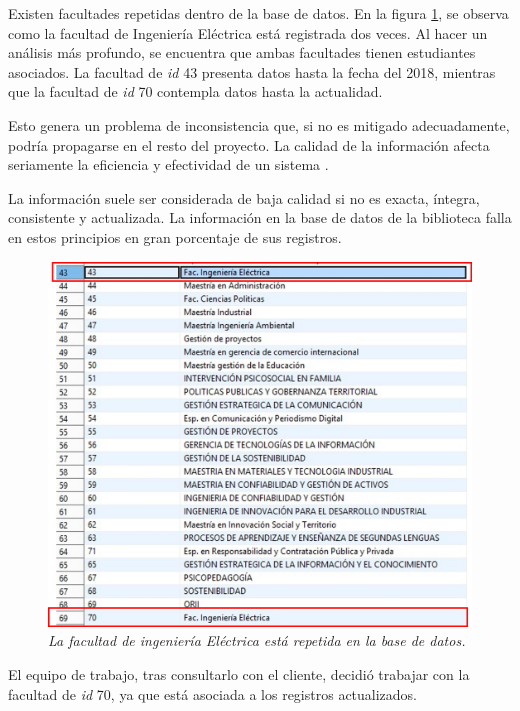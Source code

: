 \documentclass[spanish]{ieee_upb}
\begin{document}
\vspace{0.3cm}
Existen facultades repetidas dentro de la base de datos. En la figura \ref{fig:problemas-1}, se observa como la facultad de Ingeniería Eléctrica está registrada dos veces. Al hacer un análisis más profundo, se encuentra que ambas facultades tienen estudiantes asociados. La facultad de \textit{id} 43 presenta datos hasta la fecha del 2018, mientras que la facultad de \textit{id} 70 contempla datos hasta la actualidad. 

\vspace{0.3cm}
Esto genera un problema de inconsistencia que, si no es mitigado adecuadamente, podría propagarse en el resto del proyecto. La calidad de la información afecta seriamente la eficiencia y efectividad de un sistema \cite{DataQuality}.  

\vspace{0.3cm}
La información suele ser considerada de baja calidad si no es exacta, íntegra, consistente y actualizada\cite{DataQuality}. La información en la base de datos de la biblioteca falla en estos principios en gran porcentaje de sus registros.

 \begin{figure}[H] 
	\centering
	\includegraphics[width=0.8\linewidth]{img/variedades/bd-problemas1.png}
	\vspace{-1mm}
	\caption[Caso 1: Facultades en la base de datos repetidas]{\textit{La facultad de ingeniería Eléctrica está repetida en la base de datos.}}
	\label{fig:problemas-1} 
\end{figure}

El equipo de trabajo, tras consultarlo con el cliente, decidió trabajar con la facultad de \textit{id} 70, ya que está asociada a los registros actualizados. 
\end{document}

